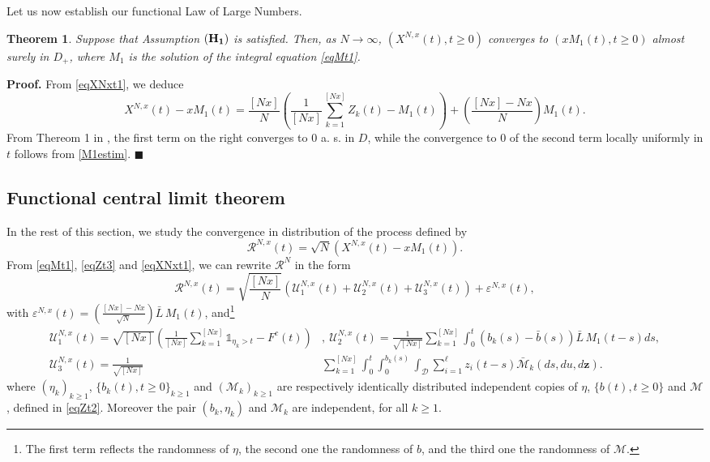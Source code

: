 \documentclass[11pt]{article}
\def\D {\mathcal{D}}
\def\L {\bar{L}}
\def\z {\mathbf{z}}
\newtheorem{theor}[theorem]{Theorem}
\newenvironment{proof}[1][Proof.]{\textbf{#1} }{\hfill $\blacksquare$}
\begin{document}
 Let us now establish our functional Law of Large Numbers.
 \begin{theor} Suppose that Assumption ${(\bf H_1)}$ is satisfied. Then, as $N \rightarrow \infty$, 
$(X^{N,x}(t), t\ge 0)$ converges to $(xM_1(t), t\ge 0)$ almost surely in $D_+$, where $M_1$ is the solution of the integral equation \eqref{eqMt1}. 
 \end{theor} 
\begin{proof}
From \eqref{eqXNxt1}, we deduce 
\begin{equation*}
X^{N,x}(t)-xM_1(t)= \frac{[Nx]}{N} \left( \frac{1}{[Nx]} \sum_{k=1}^{[Nx]} Z_k(t) - M_1(t) \right) + \left( \frac{[Nx]-Nx}{N}\right) M_1(t).
\end{equation*} 
From Thereom 1 in \cite{RR}, the first term on the right  converges to $0$ a. s. in $D$, while the convergence to $0$ of the second term locally uniformly in $t$ follows from \eqref{M1estim}.
 \end{proof}
\subsection{Functional central limit theorem}
In the rest of this section, we study the convergence in distribution of the process defined by
\begin{equation*}
\mathcal{R}^{N,x}(t)= \sqrt{N}\left(X^{N,x}(t)-xM_1(t) \right).
\end{equation*} 
From \eqref{eqMt1}, \eqref{eqZt3} and \eqref{eqXNxt1}, we can rewrite $\mathcal{R}^N$ in the form 
 \begin{equation}\label{eqRNxt1}
\mathcal{R}^{N,x}(t)= \sqrt{\frac{[Nx]}{N}}\left(\mathcal{U}_1^{N,x}(t)+\mathcal{U}_2^{N,x}(t)+\mathcal{U}_3^{N,x}(t) \right)+ \varepsilon^{N,x}(t),
\end{equation} 
with $\varepsilon^{N,x}(t)=\left(\frac{[Nx]-Nx}{\sqrt{N}}\right)\L\, M_1(t)$, and\footnote{The first term reflects the randomness of $\eta$, the second one the randomness of $b$, and the third one the randomness of $\mathcal{M}$.} 
 \begin{align*}
\mathcal{U}_1^{N,x}(t)= \sqrt{[Nx]} \left( \frac{1}{[Nx]}\sum_{k=1}^{[Nx]}  \mathds{1}_{\eta_k >t}-  F^c(t) \right)&,\
\mathcal{U}_2^{N,x}(t)=  \frac{1}{\sqrt{[Nx]}} \sum_{k=1}^{[Nx]}\int_0^t  \left( b_k(s) - \bar{b}(s)  \right)\L\, M_1(t-s)ds,
\\
\mathcal{U}_3^{N,x}(t)=  \frac{1}{\sqrt{[Nx]}} &\sum_{k=1}^{[Nx]} \int_0^t \int_0^{b_k(s)} \int_{\D} \sum_{i=1}^\ell z_i(t-s)  \bar{\mathcal{M}}_k(ds,du,d\z).
\end{align*}
where $(\eta_k)_{k\ge 1}$, $\{b_k(t), t\ge 0\}_{k\ge 1}$ and $(\mathcal{M}_k)_{k\ge 1}$ are respectively identically distributed independent copies of $\eta$, $\{b(t), t\ge 0\}$ and $\mathcal{M}$, defined in \eqref{eqZt2}. Moreover the pair $(b_k, \eta_k)$ and $\mathcal{M}_k$ are independent, for all $k\ge 1$.
\end{document}
